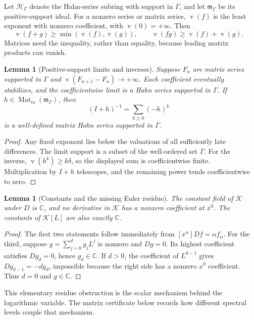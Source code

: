 \documentclass[11pt,a4paper]{article}
\numberwithin{equation}{section}
\newtheorem{lemma}[theorem]{Lemma}
\theoremstyle{definition}
\theoremstyle{remark}
\newcommand{\C}{\mathbb C}
\newcommand{\K}{\mathcal K}
\newcommand{\G}{\Gamma}
\newcommand{\Mat}{\operatorname{Mat}}
\newcommand{\val}{\operatorname{v}}
\begin{document}
Let $\mathscr H_\G$ denote the Hahn-series subring with support in $\G$,
and let $\mathfrak m_\G$ be its positive-support ideal. For a nonzero
series or matrix series, $\val(f)$ is the least exponent with nonzero
coefficient, with $\val(0)=+\infty$. Then
\[
 \val(f+g)\geq\min(\val(f),\val(g)),\qquad
 \val(fg)\geq\val(f)+\val(g).
\]
Matrices need the inequality, rather than equality, because leading matrix
products can vanish.

\begin{lemma}[Positive-support limits and inverses]\label{lem:limits}
Suppose $F_n$ are matrix series supported in $\G$ and
$\val(F_{n+1}-F_n)\to+\infty$. Each coefficient eventually stabilizes,
and the coefficientwise limit is a Hahn series supported in $\G$.
If $h\in\Mat_m(\mathfrak m_\G)$, then
\[
 (I+h)^{-1}=\sum_{k\geq0}(-h)^k
\]
is a well-defined matrix Hahn series supported in $\G$.
\end{lemma}
\begin{proof}
Any fixed exponent lies below the valuations of all sufficiently late
differences. The limit support is a subset of the well-ordered set $\G$.
For the inverse, $\val(h^k)\geq k\delta$, so the displayed sum is
coefficientwise finite. Multiplication by $I+h$ telescopes, and the
remaining power tends coefficientwise to zero.
\end{proof}

\begin{lemma}[Constants and the missing Euler residue]\label{lem:constants}
The constant field of $\K$ under $D$ is $\C$, and no derivative in
$\K$ has a nonzero coefficient at $x^0$. The constants of $\K[L]$ are
also exactly $\C$.
\end{lemma}
\begin{proof}
The first two statements follow immediately from
$[x^\alpha]Df=\alpha f_\alpha$. For the third, suppose
$g=\sum_{j=0}^d g_jL^j$ is nonzero and $Dg=0$. Its highest coefficient
satisfies $Dg_d=0$, hence $g_d\in\C$. If $d>0$, the coefficient of
$L^{d-1}$ gives $Dg_{d-1}=-dg_d$, impossible because the right side has a
nonzero $x^0$ coefficient. Thus $d=0$ and $g\in\C$.
\end{proof}

This elementary residue obstruction is the scalar mechanism behind the
logarithmic variable. The matrix certificate below records how different
spectral levels couple that mechanism.
\end{document}
